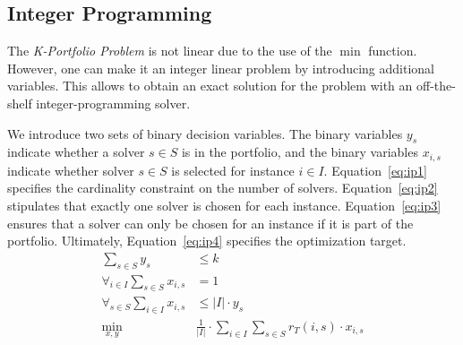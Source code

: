 \documentclass[conference]{IEEEtran}
\begin{document}
\subsection{Integer Programming}
\label{sec:approach:ip}

The \emph{K-Portfolio Problem} is not linear due to the use of the $\min$ function.
However, one can make it an integer linear problem by introducing additional variables.
This allows to obtain an exact solution for the problem with an off-the-shelf integer-programming solver.

We introduce two sets of binary decision variables. 
The binary variables $y_s$ indicate whether a solver $s \in S$ is in the portfolio, and 
the binary variables $x_{i,s}$ indicate whether solver $s \in S$ is selected for instance $i \in I$. 
Equation~\ref{eq:ip1} specifies the cardinality constraint on the number of solvers. 
Equation~\ref{eq:ip2} stipulates that exactly one solver is chosen for each instance. 
Equation~\ref{eq:ip3} ensures that a solver can only be chosen for an instance if it is part of the portfolio. 
Ultimately, Equation~\ref{eq:ip4} specifies the optimization target.%
\begin{align}
	\sum_{s \in S} y_s &\leq k \label{eq:ip1}\\
	\forall_{i\in I} \sum_{s \in S} x_{i,s} &= 1 \label{eq:ip2}\\
	\forall_{s \in S} \sum_{i \in I} x_{i,s} &\leq |I| \cdot y_s \label{eq:ip3}\\
	\min_{x,y} \quad & \frac{1}{|I|} \cdot \sum_{i \in I} \sum_{s \in S} r_T(i,s) \cdot x_{i,s} \label{eq:ip4}
\end{align}
\end{document}
